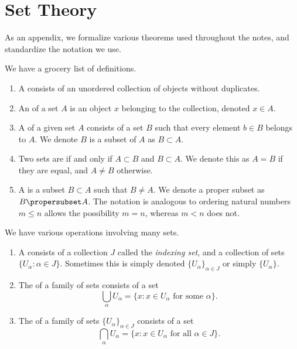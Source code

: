 
\section{Set Theory}
\M
As an appendix, we formalize various theorems used throughout the notes,
and standardize the notation we use.

 We have a grocery list of definitions.
\begin{enumerate}
\item A  consists of an unordered collection of objects without
  duplicates.

\item An  of a set $A$ is an object $x$ belonging to the
  collection, denoted $x\in A$.

\item A  of a given set $A$ consists of a set $B$ such that
  every element $b\in B$ belongs to $A$. We denote $B$ is a subset of $A$
  as $B\subset A$.

\item Two sets are  if and only if $A\subset B$ and $B\subset A$.
  We denote this as $A=B$ if they are equal, and $A\neq B$ otherwise.

\item A  is a subset $B\subset A$ such that $B\neq A$.
  We denote a proper subset as $B\propersubset A$. The notation is
  analogous to ordering natural numbers $m\leq n$ allows the possibility
  $m=n$, whereas $m<n$ does not.
\end{enumerate}

We have various operations involving many sets.

\begin{enumerate}
\item A  consists of a collection $J$ called the
  \emph{indexing set}, and a collection of sets $\{U_{\alpha} : \alpha\in J\}$.
  Sometimes this is simply denoted $\{U_{\alpha}\}_{\alpha\in J}$ or
  simply $\{U_{\alpha}\}$.
\item The  of a family of sets consists of a set
  \begin{equation}
    \bigcup_{\alpha}U_{\alpha} = \{x : x\in U_{\alpha}\mbox{ for some $\alpha$}\}.
  \end{equation}
\item The  of a family of sets $\{U_{\alpha}\}_{\alpha\in{J}}$ consists of a set
  \begin{equation}
    \bigcap_{\alpha}U_{\alpha} = \{x : x\in U_{\alpha}\mbox{ for all
      $\alpha\in J$}\}.
  \end{equation}
\end{enumerate}

